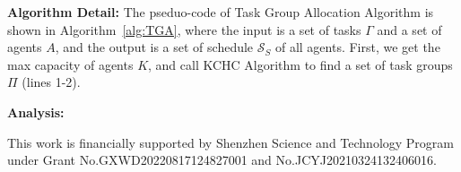 \documentclass[sigconf,anonymous]{aamas}
\begin{document}
\textbf{Algorithm Detail:}
The pseduo-code of Task Group Allocation Algorithm is shown in Algorithm~\ref{alg:TGA},
where the input is a set of tasks $\Gamma$ and a set of agents $A$,
and the output is a set of schedule $\mathcal{S}_S$ of all agents.
First, we get the max capacity of agents $K$,
and call KCHC Algorithm to find a set of task groups $\Pi$ (lines 1-2).


\textbf{Analysis:}


 
\begin{acks}
  This work is financially supported by Shenzhen Science and Technology Program 
  under Grant No.GXWD20220817124827001 and No.JCYJ20210324132406016.
\end{acks}



 


\end{document}
